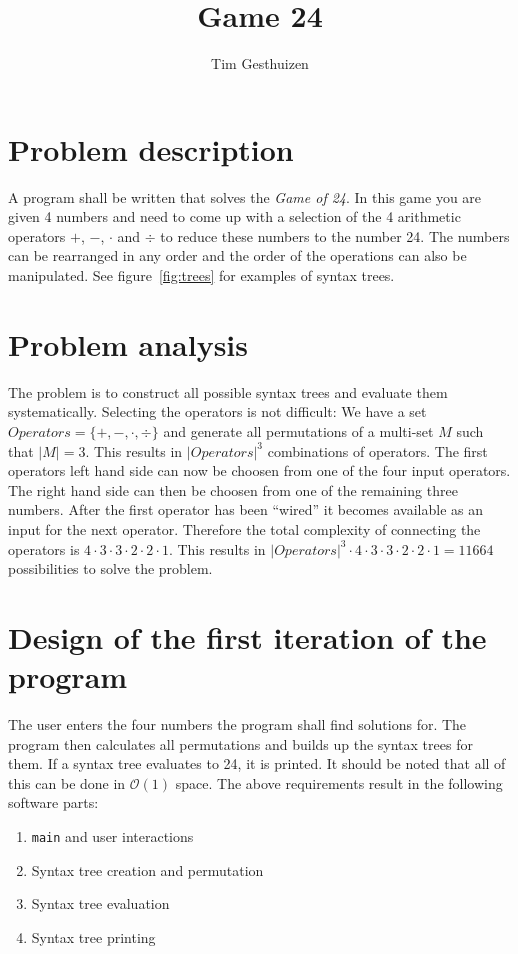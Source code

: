 \documentclass[11pt,a4paper]{article}
\author{Tim Gesthuizen}
\title{Game 24}
\begin{document}
\maketitle

\section{Problem description}

A program shall be written that solves the \textit{Game of 24}.
In this game you are given 4 numbers and need to come up with a
selection of the 4 arithmetic operators $+$, $-$, $\cdot$ and $\div$ to
reduce these numbers to the number 24.
The numbers can be rearranged in any order and the order of the
operations can also be manipulated.
See figure~\ref{fig:trees} for examples of syntax trees.



\section{Problem analysis}

The problem is to construct all possible syntax trees and evaluate
them systematically.
Selecting the operators is not difficult:
We have a set $Operators = \{+, -, \cdot, \div\}$ and generate all
permutations of a multi-set $M$ such that $\vert M \vert = 3$.
\newcommand{\complexop}{{\vert Operators \vert}^3}
\newcommand{\opconnect}{4 \cdot 3 \cdot 3 \cdot 2 \cdot 2 \cdot 1}
This results in $\complexop$ combinations of
operators.
The first operators left hand side can now be choosen from one of the
four input operators.
The right hand side can then be choosen from one of the remaining
three numbers.
After the first operator has been ``wired'' it becomes available as an
input for the next operator.
Therefore the total complexity of connecting the operators is $\opconnect$.
This results in
$\complexop \cdot \opconnect = 11664$ possibilities to solve the
problem.

\section{Design of the first iteration of the program}

The user enters the four numbers the program shall find solutions
for. The program then calculates all permutations and builds up the
syntax trees for them. If a syntax tree evaluates to 24, it is
printed.
It should be noted that all of this can be done in $\mathcal{O}(1)$
space.
The above requirements result in the following software parts:
\begin{enumerate}
\item {\tt main} and user interactions
\item Syntax tree creation and permutation
\item Syntax tree evaluation
\item Syntax tree printing
\end{enumerate}
\end{document}
